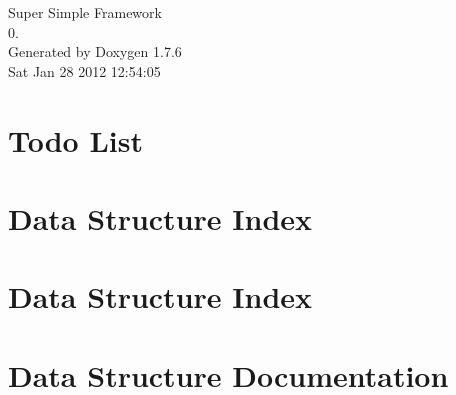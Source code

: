 \documentclass[a4paper]{book}
\begin{document}
\hypersetup{pageanchor=false,citecolor=blue}
\begin{titlepage}
\vspace*{7cm}
\begin{center}
{\Large \-Super \-Simple \-Framework \\[1ex]\large 0. }\\
\vspace*{1cm}
{\large \-Generated by Doxygen 1.7.6}\\
\vspace*{0.5cm}
{\small Sat Jan 28 2012 12:54:05}\\
\end{center}
\end{titlepage}
\clearemptydoublepage
{}
\tableofcontents
\clearemptydoublepage
{}
\hypersetup{pageanchor=true,citecolor=blue}
\chapter{\-Todo \-List}
\label{todo}
\hypertarget{todo}{}

\chapter{\-Data \-Structure \-Index}

\chapter{\-Data \-Structure \-Index}

\chapter{\-Data \-Structure \-Documentation}

























\end{document}
